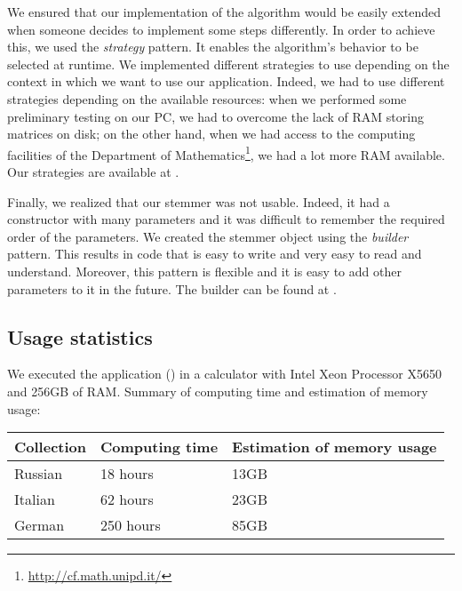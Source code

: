             We ensured that our implementation of the algorithm would be easily extended when someone decides to implement some steps differently.
            In order to achieve this, we used the \emph{strategy} pattern. It enables the algorithm's behavior to be selected at runtime. We implemented different strategies to use depending on the context in which we want to use our application. Indeed, we had to use different strategies depending on the available resources: when we performed some preliminary testing on our PC, we had to overcome the lack of RAM storing matrices on disk; on the other hand, when we had access to the computing facilities of the Department of Mathematics\footnote{\url{http://cf.math.unipd.it/}}, we had a lot more RAM available. Our strategies are available at .
            
            Finally, we realized that our stemmer was not usable. Indeed, it had a constructor with many parameters and it was difficult to remember the required order of the parameters. We created the stemmer object using the \emph{builder} pattern. This results in code that is easy to write and very easy to read and understand. Moreover, this pattern is flexible and it is easy to add other parameters to it in the future. The builder can be found at .

    \subsection{Usage statistics}
        We executed the application () in a calculator with Intel\textsuperscript{\textregistered} Xeon\textsuperscript{\textregistered} Processor X5650 and 256GB of RAM. Summary of computing time and estimation of memory usage:
        \begin{center}
			\begin{tabular}[H]{| p{} | p{} | p{} |}
                \hline
                Collection  & Computing time    & Estimation of memory usage \\ \hline\hline
				Russian     & 18 hours          & 13GB                       \\ \hline
                Italian     & 62 hours          & 23GB                       \\ \hline
                German      & 250 hours         & 85GB                       \\ \hline %
			\end{tabular}
        \end{center}